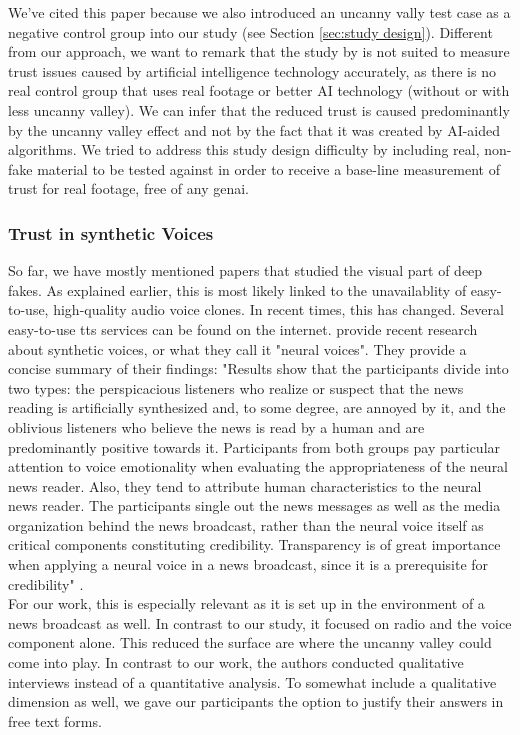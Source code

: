 \documentclass[
  a4paper,  %
  twoside,  %
  bibliography=totoc,
  headsepline,
  cleardoublepage=empty,
  parskip=half,
  draft=false
]{scrbook}
\begin{document}
We've cited this paper because we also introduced an uncanny vally test case as a negative control group into our study (see Section \ref{sec:study design}). Different from our approach, we want to remark that the study by  is not suited to measure trust issues caused by artificial intelligence technology accurately, as there is no real control group that uses real footage or better AI technology (without or with less uncanny valley). We can infer that the reduced trust is caused predominantly by the uncanny valley effect and not by the fact that it was created by AI-aided algorithms. We tried to address this study design difficulty by including real, non-fake material to be tested against in order to receive a base-line measurement of trust for real footage, free of any \gls{genai}.

\subsubsection*{Trust in synthetic Voices}
So far, we have mostly mentioned papers that studied the visual part of deep fakes. As explained earlier, this is most likely linked to the unavailablity of easy-to-use, high-quality audio voice clones. In recent times, this has changed. Several easy-to-use \gls{tts} services can be found on the internet.  provide recent research about synthetic voices, or what they call it "neural voices". They provide a concise summary of their findings: "Results show that the participants divide into two types: the perspicacious listeners who realize or suspect that the news reading is artificially synthesized and, to some degree, are annoyed by it, and the oblivious listeners who believe the news is read by a human and are predominantly positive towards it. Participants from both groups pay particular attention to voice emotionality when evaluating the appropriateness of the neural news reader. Also, they tend to attribute human characteristics to the neural news reader. The participants single out the news messages as well as the media organization behind the news broadcast, rather than the neural voice itself as critical components constituting credibility. Transparency is of great importance when applying a neural voice in a news broadcast, since it is a prerequisite for credibility" \cite{heiselbergAutomatedNewsReading2022}. \\
For our work, this is especially relevant as it is set up in the environment of a news broadcast as well. In contrast to our study, it focused on radio and the voice component alone. This reduced the surface are where the uncanny valley could come into play. In contrast to our work, the authors conducted qualitative interviews instead of a quantitative analysis. To somewhat include a qualitative dimension as well, we gave our participants the option to justify their answers in free text forms. 
\end{document}
